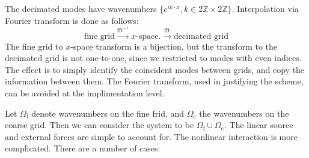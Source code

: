 \documentclass[10pt,showpacs,showkeys,%
amsfonts,amsmath,onecolumn,
floatfix,aps,superscriptaddress]{revtex4}
\begin{document}
The decimated modes have wavenumbers 
$\{e^{i k \cdot x}, k \in 2\mathbb{Z}\times2\mathbb{Z}\}$.
Interpolation via Fourier transform is done as follows:
\begin{dmath}
  \text{fine grid} \xrightarrow{\text{fft}^{-1}} x\text{-space}.
  \xrightarrow{\text{fft}} \text{decimated grid}
\end{dmath}
The fine grid to $x$-space transform is a bijection, but the transform
to the decimated grid is not one-to-one, since we restricted to modes
with even indices. The effect is to simply identify the coincident
modes between grids, and copy the information between them.  The
Fourier transform, used in justifying the scheme, can be avoided at
the implimentation level.

Let $\Omega_{\text{f}}$ denote wavenumbers on the fine frid, and
$\Omega_{\text{c}}$ the wavenumbers on the coarse grid. Then we can
consider the system to be $\Omega_{\text{f}} \cup \Omega_{\text{c}}$.
The linear source and external forces are simple to account for.
The nonlinear interaction is more complicated.  There are a number
of cases:
\end{document}
